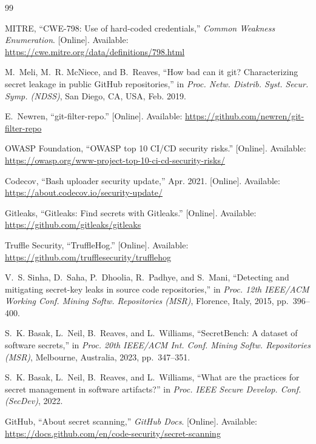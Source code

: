 \documentclass[conference]{IEEEtran}
\begin{document}
\begin{thebibliography}{99}

MITRE, ``CWE-798: Use of hard-coded credentials,'' \emph{Common Weakness Enumeration}. [Online].
Available: \url{https://cwe.mitre.org/data/definitions/798.html}

M.~Meli, M.~R. McNiece, and B.~Reaves, ``How bad can it git? {C}haracterizing secret leakage in
public {GitHub} repositories,'' in \emph{Proc. Netw. Distrib. Syst. Secur. Symp. (NDSS)}, San Diego,
CA, USA, Feb. 2019.

E.~Newren, ``git-filter-repo.'' [Online]. Available: \url{https://github.com/newren/git-filter-repo}

OWASP Foundation, ``OWASP top 10 {CI/CD} security risks.'' [Online]. Available:
\url{https://owasp.org/www-project-top-10-ci-cd-security-risks/}

Codecov, ``Bash uploader security update,'' Apr. 2021. [Online]. Available:
\url{https://about.codecov.io/security-update/}

Gitleaks, ``Gitleaks: Find secrets with Gitleaks.'' [Online]. Available:
\url{https://github.com/gitleaks/gitleaks}

Truffle Security, ``TruffleHog.'' [Online]. Available:
\url{https://github.com/trufflesecurity/trufflehog}

V.~S. Sinha, D.~Saha, P.~Dhoolia, R.~Padhye, and S.~Mani, ``Detecting and mitigating secret-key
leaks in source code repositories,'' in \emph{Proc. 12th IEEE/ACM Working Conf. Mining Softw.
Repositories (MSR)}, Florence, Italy, 2015, pp.~396--400.

S.~K. Basak, L.~Neil, B.~Reaves, and L.~Williams, ``{SecretBench}: A dataset of software secrets,''
in \emph{Proc. 20th IEEE/ACM Int. Conf. Mining Softw. Repositories (MSR)}, Melbourne, Australia,
2023, pp.~347--351.

S.~K. Basak, L.~Neil, B.~Reaves, and L.~Williams, ``What are the practices for secret management in
software artifacts?'' in \emph{Proc. IEEE Secure Develop. Conf. (SecDev)}, 2022.

GitHub, ``About secret scanning,'' \emph{GitHub Docs}. [Online]. Available:
\url{https://docs.github.com/en/code-security/secret-scanning}


\end{thebibliography}
\end{document}
